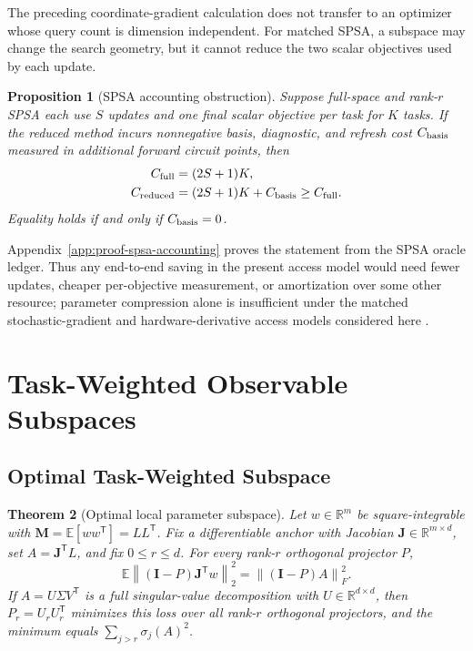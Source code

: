 \documentclass[aps,prx,reprint,superscriptaddress,floatfix]{revtex4-2}
\newtheorem{theorem}{Theorem}[section]
\newtheorem{proposition}[theorem]{Proposition}
\newcommand{\E}{\mathbb{E}}
\newcommand{\R}{\mathbb{R}}
\newcommand{\J}{\mathbf{J}}
\newcommand{\M}{\mathbf{M}}
\newcommand{\I}{\mathbf{I}}
\newcommand{\trans}{\mathsf{T}}
\newcommand{\norm}[1]{\left\lVert #1\right\rVert}
\begin{document}
The preceding coordinate-gradient calculation does not transfer to an
optimizer whose query count is dimension independent.  For matched SPSA, a
subspace may change the search geometry, but it cannot reduce the two scalar
objectives used by each update.

\begin{proposition}[SPSA accounting obstruction]
\label{prop:spsa-accounting}
Suppose full-space and rank-$r$ SPSA each use $S$ updates and one final scalar
objective per task for $K$ tasks.  If the reduced method incurs nonnegative
basis, diagnostic, and refresh cost $C_{\rm basis}$ measured in additional
forward circuit points, then
\begin{equation}
 \begin{aligned}
 C_{\rm full}&=(2S+1)K,\\
 C_{\rm reduced}&=(2S+1)K+C_{\rm basis}\ge C_{\rm full}.
 \end{aligned}
 \label{eq:spsa-accounting}
\end{equation}
Equality holds if and only if $C_{\rm basis}=0$.
\end{proposition}

Appendix~\ref{app:proof-spsa-accounting} proves the statement from the SPSA
oracle ledger.  Thus any end-to-end saving in the present access model would
need fewer updates, cheaper per-objective measurement, or amortization over
some other resource; parameter compression alone is insufficient under the
matched stochastic-gradient and hardware-derivative access models considered
here \citep{spall1992spsa,schuld2019evaluating,wierichs2022general}.

\section{Task-Weighted Observable Subspaces}

\subsection{Optimal Task-Weighted Subspace}

\begin{theorem}[Optimal local parameter subspace]
\label{thm:optimal}
Let $w\in\R^m$ be square-integrable with
$\M=\E[ww^{\trans}]=LL^{\trans}$.  Fix a differentiable anchor with Jacobian
$\J\in\R^{m\times d}$, set $A=\J^{\trans}L$, and fix
$0\le r\le d$.  For every rank-$r$ orthogonal projector $P$,
\begin{equation}
 \E\norm{(\I-P)\J^{\trans}w}_2^2
 =\norm{(\I-P)A}_F^2.
 \label{eq:identity}
\end{equation}
If $A=U\Sigma V^{\trans}$ is a full singular-value decomposition with
$U\in\R^{d\times d}$, then
$P_r=U_rU_r^{\trans}$ minimizes this loss over all rank-$r$ orthogonal
projectors, and the minimum equals
$\sum_{j>r}\sigma_j(A)^2$.
\end{theorem}
\end{document}
